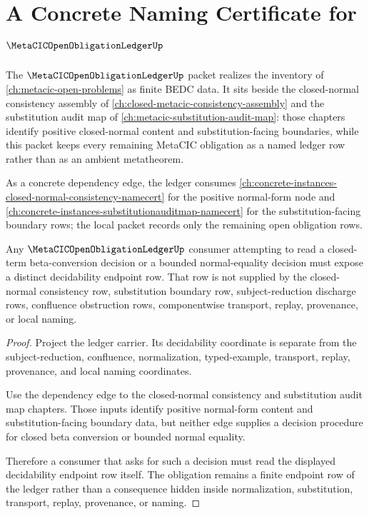 \chapter{A Concrete Naming Certificate for $\MetaCICOpenObligationLedgerUp$}
\label{ch:concrete-instances-metacicopenobligationledger-namecert}

The $\MetaCICOpenObligationLedgerUp$ packet realizes the inventory of \autoref{ch:metacic-open-problems} as finite BEDC data. It sits beside the closed-normal consistency assembly of \autoref{ch:closed-metacic-consistency-assembly} and the substitution audit map of \autoref{ch:metacic-substitution-audit-map}: those chapters identify positive closed-normal content and substitution-facing boundaries, while this packet keeps every remaining MetaCIC obligation as a named ledger row rather than as an ambient metatheorem.

As a concrete dependency edge, the ledger consumes \autoref{ch:concrete-instances-closed-normal-consistency-namecert} for the positive normal-form node and \autoref{ch:concrete-instances-substitutionauditmap-namecert} for the substitution-facing boundary rows; the local packet records only the remaining open obligation rows.

\begin{theorem}
\label{thm:metacic-open-obligation-decidability-endpoint-row}
Any $\MetaCICOpenObligationLedgerUp$ consumer attempting to read a closed-term beta-conversion decision or a bounded normal-equality decision must expose a distinct decidability endpoint row. That row is not supplied by the closed-normal consistency row, substitution boundary row, subject-reduction discharge rows, confluence obstruction rows, componentwise transport, replay, provenance, or local naming.
\end{theorem}
\begin{proof}
Project the ledger carrier. Its decidability coordinate is separate from the subject-reduction, confluence, normalization, typed-example, transport, replay, provenance, and local naming coordinates.

Use the dependency edge to the closed-normal consistency and substitution audit map chapters. Those inputs identify positive normal-form content and substitution-facing boundary data, but neither edge supplies a decision procedure for closed beta conversion or bounded normal equality.

Therefore a consumer that asks for such a decision must read the displayed decidability endpoint row itself. The obligation remains a finite endpoint row of the ledger rather than a consequence hidden inside normalization, substitution, transport, replay, provenance, or naming.
\end{proof}

